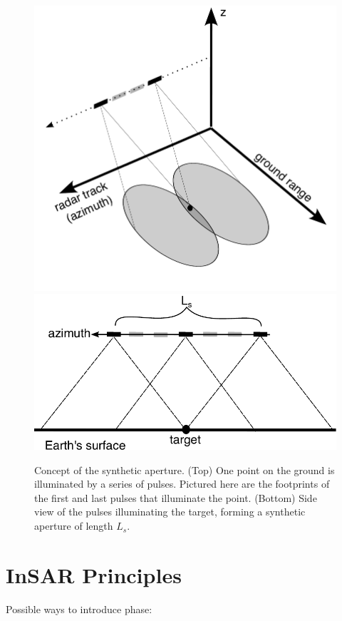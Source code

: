 \begin{figure}
	\centering
	\includegraphics[width=0.8\linewidth]{figures/chapter3-sar/ch3-synth-aper2.pdf}
	\includegraphics[width=0.99\linewidth]{figures/chapter3-sar/ch3-sar-synthetic-aperture.pdf}
	\caption[Concept of the synthetic aperture ]{Concept of the synthetic aperture.
	(Top) One point on the ground is illuminated by a series of pulses. Pictured here are the footprints of the first and last pulses that illuminate the point. 
	(Bottom) Side view of the pulses illuminating the target, forming a synthetic aperture of length $L_s$.
	}
	\label{fig:ch3-synth-aper}
\end{figure}



\section{InSAR Principles}


Possible ways to introduce phase:

